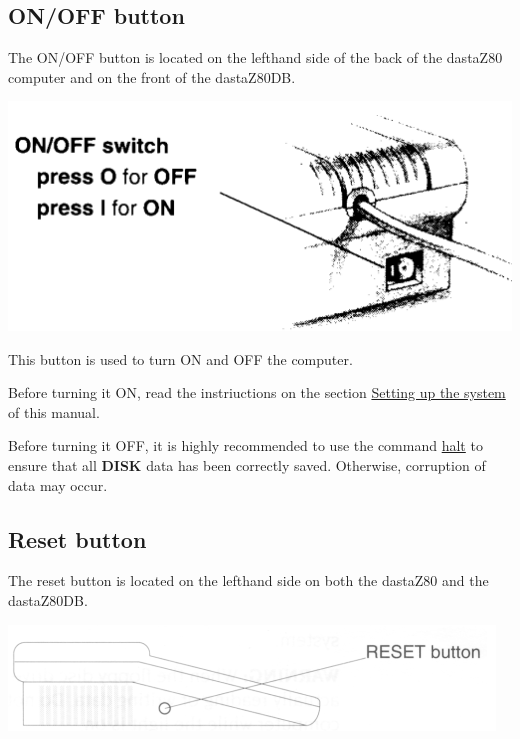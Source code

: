     \pagebreak
    
    \subsection{ON/OFF button}
    \label{subsec:onoffbutt}

    The ON/OFF button is located on the lefthand side of the back of the
    dastaZ80 computer and on the front of the dastaZ80DB.

    \includegraphics[scale=0.5]{images/onoffbutton.png}

    This button is used to turn ON and OFF the computer.

    Before turning it ON, read the instriuctions on the section
    \hyperref[sec:setting_system]{Setting up the system} of this manual.

    Before turning it OFF, it is highly recommended to use the command 
    \hyperref[cmd:halt]{halt} to ensure that all \textbf{DISK} data has been
    correctly saved. Otherwise, corruption of data may occur.

    \subsection{Reset button}
    \label{subsec:resetbutton}

    The reset button is located on the lefthand side on both the dastaZ80 and
    the dastaZ80DB.

    \includegraphics[scale=0.7]{images/resetbutton.png}


